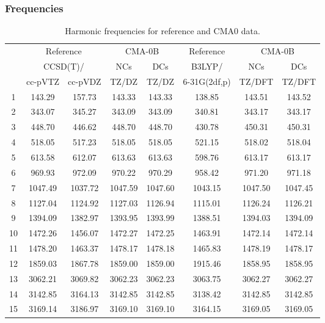 \documentclass[10pt,oneside]{article}
\begin{document}
\subsubsection*{Frequencies}
\begin{table}[h!]
\centering
\caption{Harmonic frequencies for reference and CMA0 data.}
\begin{tabular}{cccccccc}
\toprule
{} & \multicolumn{2}{c}{Reference} & \multicolumn{2}{c}{CMA-0B} &    Reference & \multicolumn{2}{c}{CMA-0B} \\
{} & \multicolumn{2}{c}{CCSD(T)/} &     NCs &     DCs &       B3LYP/ &     NCs &     DCs \\
{} &   cc-pVTZ & cc-pVDZ &   TZ/DZ &   TZ/DZ & 6-31G(2df,p) &  TZ/DFT &  TZ/DFT \\
\midrule
1  &    143.29 &  157.73 &  143.33 &  143.33 &       138.85 &  143.51 &  143.52 \\
2  &    343.07 &  345.27 &  343.09 &  343.09 &       340.81 &  343.17 &  343.17 \\
3  &    448.70 &  446.62 &  448.70 &  448.70 &       430.78 &  450.31 &  450.31 \\
4  &    518.05 &  517.23 &  518.05 &  518.05 &       521.15 &  518.02 &  518.04 \\
5  &    613.58 &  612.07 &  613.63 &  613.63 &       598.76 &  613.17 &  613.17 \\
6  &    969.93 &  972.09 &  970.22 &  970.29 &       958.42 &  971.20 &  971.18 \\
7  &   1047.49 & 1037.72 & 1047.59 & 1047.60 &      1043.15 & 1047.50 & 1047.45 \\
8  &   1127.04 & 1124.92 & 1127.03 & 1126.94 &      1115.01 & 1126.24 & 1126.21 \\
9  &   1394.09 & 1382.97 & 1393.95 & 1393.99 &      1388.51 & 1394.03 & 1394.09 \\
10 &   1472.26 & 1456.07 & 1472.27 & 1472.25 &      1463.91 & 1472.14 & 1472.14 \\
11 &   1478.20 & 1463.37 & 1478.17 & 1478.18 &      1465.83 & 1478.19 & 1478.17 \\
12 &   1859.03 & 1867.78 & 1859.00 & 1859.00 &      1915.46 & 1858.95 & 1858.95 \\
13 &   3062.21 & 3069.82 & 3062.23 & 3062.23 &      3063.75 & 3062.27 & 3062.27 \\
14 &   3142.85 & 3164.13 & 3142.85 & 3142.85 &      3138.42 & 3142.85 & 3142.85 \\
15 &   3169.14 & 3186.97 & 3169.10 & 3169.10 &      3164.15 & 3169.05 & 3169.05 \\
\bottomrule
\end{tabular}
\end{table}
\end{document}
